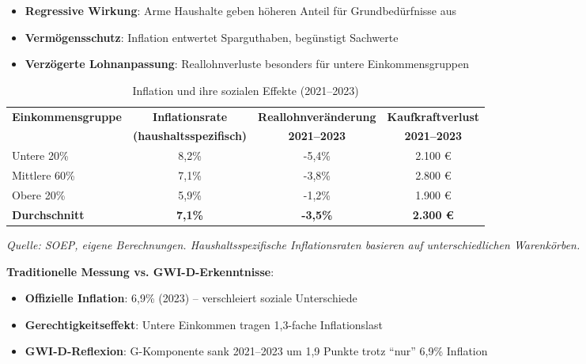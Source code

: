 \begin{itemize}
    \item \textbf{Regressive Wirkung}: Arme Haushalte geben höheren Anteil für Grundbedürfnisse aus
    \item \textbf{Vermögensschutz}: Inflation entwertet Sparguthaben, begünstigt Sachwerte
    \item \textbf{Verzögerte Lohnanpassung}: Reallohnverluste besonders für untere Einkommensgruppen
\end{itemize}

\begin{table}[ht]
    \centering
    \caption{Inflation und ihre sozialen Effekte (2021–2023)}
    \label{tab:inflation_sozialeffekte}
    \begin{tabular}{lccc}
        \toprule
        \textbf{Einkommensgruppe} & \textbf{Inflationsrate} & \textbf{Reallohnveränderung} & \textbf{Kaufkraftverlust} \\
        & \textbf{(haushaltsspezifisch)} & \textbf{2021–2023} & \textbf{2021–2023} \\
        \midrule
        Untere 20\% & 8,2\% & -5,4\% & 2.100 € \\
        Mittlere 60\% & 7,1\% & -3,8\% & 2.800 € \\
        Obere 20\% & 5,9\% & -1,2\% & 1.900 € \\
        \midrule
        \textbf{Durchschnitt} & \textbf{7,1\%} & \textbf{-3,5\%} & \textbf{2.300 €} \\
        \bottomrule
    \end{tabular}
\end{table}

\begin{flushleft}
\footnotesize{\textit{Quelle: SOEP, eigene Berechnungen. Haushaltsspezifische Inflationsraten basieren auf unterschiedlichen Warenkörben.}}
\end{flushleft}

\textbf{Traditionelle Messung vs. GWI-D-Erkenntnisse}:

\begin{itemize}
    \item \textbf{Offizielle Inflation}: 6,9\% (2023) – verschleiert soziale Unterschiede
    \item \textbf{Gerechtigkeitseffekt}: Untere Einkommen tragen 1,3-fache Inflationslast
    \item \textbf{GWI-D-Reflexion}: G-Komponente sank 2021–2023 um 1,9 Punkte trotz \enquote{nur} 6,9\% Inflation
\end{itemize}

